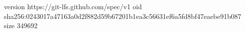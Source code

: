 version https://git-lfs.github.com/spec/v1
oid sha256:0243017a47163a0d2f882d59b67201b1ea3c56631ef6a5fd8bf47eaebe91b087
size 349692
